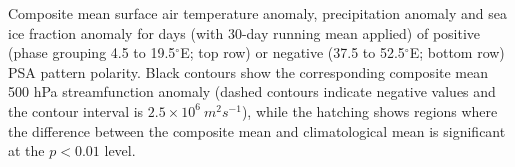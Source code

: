 \label{fig:surface_composites}
Composite mean surface air temperature anomaly, precipitation anomaly and sea ice fraction anomaly for days (with 30-day running mean applied) of positive (phase grouping 4.5 to 19.5$^{\circ}$E; top row) or negative (37.5 to 52.5$^{\circ}$E; bottom row) PSA pattern polarity. Black contours show the corresponding composite mean 500 hPa streamfunction anomaly (dashed contours indicate negative values and the contour interval is $2.5 \times 10^6 \: m^2 s^{-1}$), while the hatching shows regions where the difference between the composite mean and climatological mean is significant at the $p < 0.01$ level.